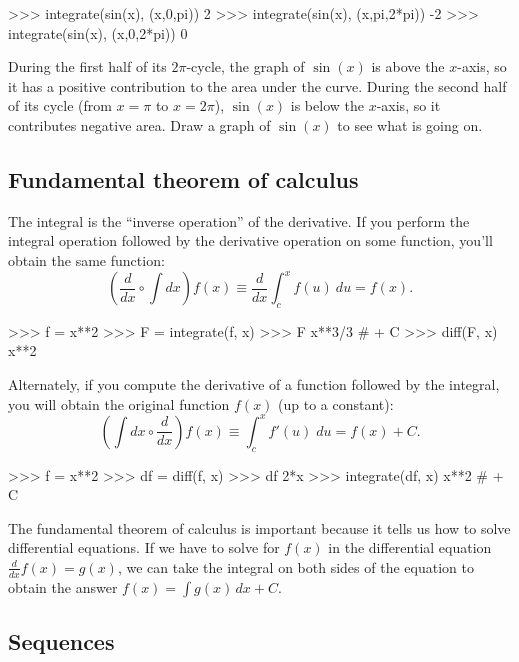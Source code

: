 \small
\begin{verbatimtab}
>>> integrate(sin(x), (x,0,pi))
2
>>> integrate(sin(x), (x,pi,2*pi))
-2
>>> integrate(sin(x), (x,0,2*pi))
0
\end{verbatimtab}
\normalsize

\noindent
During the first half of its $2\pi$-cycle,
the graph of $\sin(x)$ is above the $x$-axis, so it has a positive contribution to the area under the curve.
During the second half of its cycle (from $x=\pi$ to $x=2\pi$),
$\sin(x)$ is below the $x$-axis, so it contributes negative area.
Draw a graph of $\sin(x)$ to see what is going on. 

\subsection{Fundamental theorem of calculus}
\label{calculus:fundamental_theorem_of_calculus}

The integral is the ``inverse operation'' of the derivative.
If you perform the integral operation followed by the derivative operation on some function, 
you'll obtain the same function:
\[
  \left(\frac{d}{dx} \circ \int dx \right) f(x) \equiv \frac{d}{dx} \int_c^x f(u)\:du = f(x).
\]



\small
\begin{verbatimtab}
>>> f = x**2
>>> F = integrate(f, x)
>>> F
x**3/3           # + C
>>> diff(F, x)
x**2
\end{verbatimtab}
\normalsize

\noindent
Alternately, if you compute the derivative of a function followed by the integral,
you will obtain the original function $f(x)$ (up to a constant):
\[
  \left( \int dx \circ \frac{d}{dx}\right) f(x) \equiv \int_c^x f'(u)\;du = f(x) + C.
\]



\small
\begin{verbatimtab}
>>> f = x**2
>>> df = diff(f, x)
>>> df
2*x
>>> integrate(df, x)
x**2    # + C
\end{verbatimtab}
\normalsize

\noindent
The fundamental theorem of calculus is important because it tells us how to solve differential equations.
If we have to solve for $f(x)$ in the differential equation $\frac{d}{dx}f(x) = g(x)$,
we can take the integral on both sides of the equation to obtain the answer $f(x) = \int g(x)\,dx + C$.

\subsection{Sequences}
\label{calculus:sequences}

